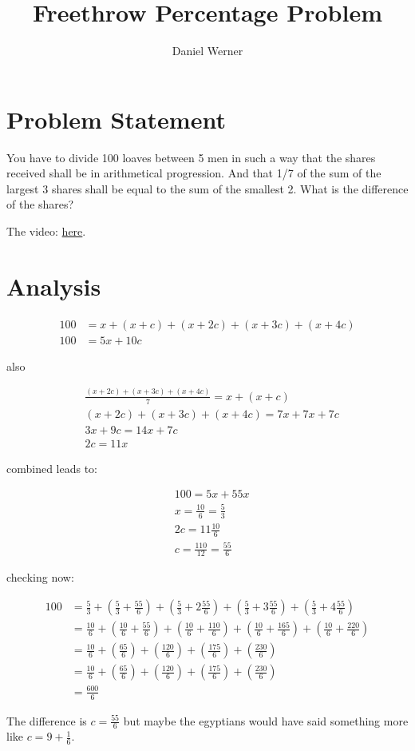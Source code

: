 \documentclass{article}
\title{Freethrow Percentage Problem}
\author{Daniel Werner}
\begin{document}
\maketitle

\section*{Problem Statement}
You have to divide 100 loaves between 5 men in such a way that the shares received shall be in arithmetical progression. And that 1/7 of the sum of the largest 3 shares shall be equal to the sum of the smallest 2. What is the difference of the shares?

The video: \href{https://www.youtube.com/watch?v=g_qbIsltNmQ}{here}.

\section*{Analysis}

\begin{align*}
    100 &= x + (x + c) + (x + 2c) + (x + 3 c) + (x + 4c) \\
    100 &= 5x + 10c
\end{align*}

also

\begin{align*}
    &\frac{(x + 2c) + (x + 3 c) + (x + 4c)}{7} = x + (x + c) \\
    &(x + 2c) + (x + 3 c) + (x + 4c) = 7x + 7x + 7c \\
    &3x + 9c = 14x + 7c \\
    &2c = 11x
\end{align*}

combined leads to:

\begin{align*}
    &100 = 5x + 55x \\
    &x = \frac{10}{6} = \frac{5}{3} \\
    &2c = 11 \frac{10}{6} \\
    &c = \frac{110}{12} = \frac{55}{6}
\end{align*}

checking now:

\begin{align*}
    100 &= \frac{5}{3} + 
    (\frac{5}{3} + \frac{55}{6}) + 
    (\frac{5}{3} + 2\frac{55}{6}) + 
    (\frac{5}{3} + 3 \frac{55}{6}) + 
    (\frac{5}{3} + 4\frac{55}{6}) \\
    &= \frac{10}{6} + 
    (\frac{10}{6} + \frac{55}{6}) + 
    (\frac{10}{6} + \frac{110}{6}) + 
    (\frac{10}{6} + \frac{165}{6}) + 
    (\frac{10}{6} + \frac{220}{6}) \\
    &= \frac{10}{6} + 
    (\frac{65}{6}) + 
    (\frac{120}{6}) + 
    (\frac{175}{6}) + 
    (\frac{230}{6}) \\
    &= \frac{10}{6} + 
    (\frac{65}{6}) + 
    (\frac{120}{6}) + 
    (\frac{175}{6}) + 
    (\frac{230}{6}) \\
    &= \frac{600}{6}
\end{align*}

The difference is $c = \frac{55}{6}$ but maybe the egyptians would have said something more like $c = 9 + \frac{1}{6}$.
\end{document}
